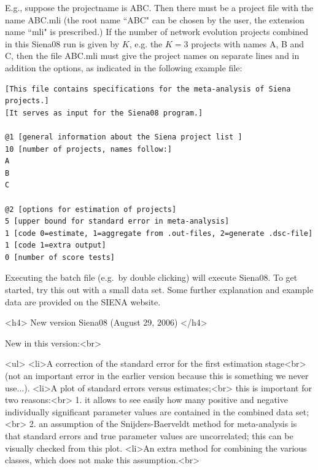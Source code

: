 \documentclass[a4paper,fleqn]{article}
\newcommand{\+}{\, + \,}
\newcommand{\SI}{{\sf SIENA }}
\begin{document}
{   E.g., suppose the projectname is \textsf{ABC}.
   Then there must be a project file with the name \textsf{ABC.mli}
   (the root name ``\textsf{ABC}" can be chosen by the user,
   the extension name ``\textsf{mli}" is prescribed.)
   If the number of network evolution projects combined in this \textsf{Siena08} run
   is given by $K$, e.g. the $K=3$ projects with names A, B and C,
   then the file \textsf{ABC.mli} must give the project names
   on separate lines and in addition the options, as indicated
   in the following example file:

\begin{verbatim}
[This file contains specifications for the meta-analysis of Siena projects.]
[It serves as input for the Siena08 program.]

@1 [general information about the Siena project list ]
10 [number of projects, names follow:]
A
B
C

@2 [options for estimation of projects]
5 [upper bound for standard error in meta-analysis]
1 [code 0=estimate, 1=aggregate from .out-files, 2=generate .dsc-file]
1 [code 1=extra output]
0 [number of score tests]
\end{verbatim}

   \noindent
   Executing the batch file (e.g.\ by double clicking) will execute \textsf{Siena08}.
   To get started, try this out with a small data set.
   Some further explanation and example data are provided on the \SI website.
\bigskip

\iffalse

<h4>
New version Siena08 (August 29, 2006)
</h4>

New in this version:<br>

<ul>
<li>A correction of the standard error for the first estimation stage<br>
    (not an important error in the earlier version because this is something we never use...).
<li>A plot of standard errors versus estimates;<br>
    this is important for two reasons:<br>
    1. it allows to see easily how many positive and negative individually significant
     parameter values are contained in the combined data set;<br>
    2. an assumption of the Snijders-Baerveldt \citeyearpar{SnijdersBaerveldt03}
    method for meta-analysis is that standard errors and true parameter values
    are uncorrelated; this can be visually checked from this plot.
<li>An extra method for combining the various classes, which does not make this assumption.<br>

}
\end{document}
